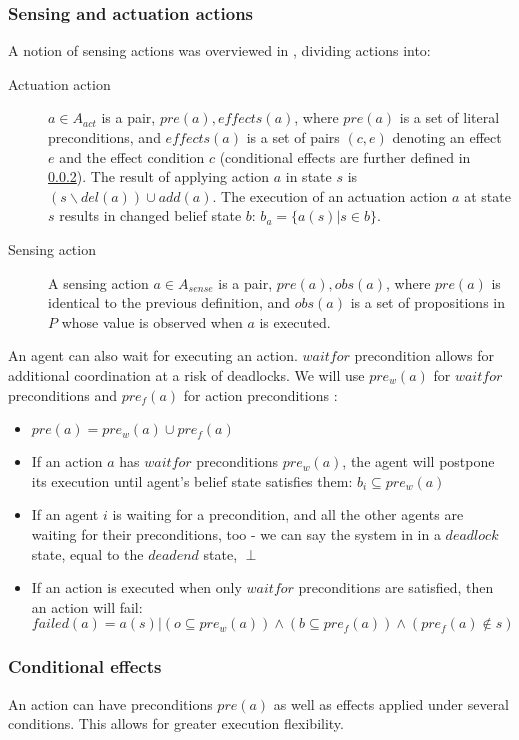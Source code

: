 \documentclass[fleqn,10pt]{olplainarticle}
\begin{document}
\subsubsection{Sensing and actuation actions}
A notion of sensing actions was overviewed in \cite{maliah_partially_2014}, dividing actions into:
\begin{description}
\item [Actuation action] $a \in A_{act}$ is a pair, ${pre(a), effects(a)}$, where $pre(a)$ is a set of literal preconditions, and $effects(a)$ is a set of pairs $(c, e)$ denoting an effect $e$ and the effect condition $c$ (conditional effects are further defined in \ref{cond-eff}). The result of applying action $a$ in state $s$ is $(s \backslash del(a)) \cup add(a)$. 
The execution of an actuation action $a$ at state $s$ results in changed belief state $b$: $b_a = \{a(s)|s \in b\}$. \label{belief-state}
\item [Sensing action] A sensing action $a \in A_{sense}$ is a pair, ${pre(a), obs(a)}$, where $pre(a)$ is identical to the previous definition, and $obs(a)$ is a set of propositions in $P$ whose value is observed when $a$ is executed. 
\end{description}

An agent can also wait for executing an action. $waitfor$ precondition allows for additional coordination at a risk of deadlocks. We will use $pre_w(a)$ for $waitfor$ preconditions and $pre_f(a)$ for action preconditions \cite{karpas_automated_2017}:
\begin{itemize}
    \item $pre(a) = pre_w(a) \cup pre_f(a)$
    \item If an action $a$ has $waitfor$ preconditions $pre_w(a)$, the agent will postpone its execution until agent's belief state satisfies them: $b_i \subseteq pre_w(a)$
    \item If an agent $i$ is waiting for a precondition, and all the other agents are waiting for their preconditions, too - we can say the system in in a $deadlock$ state, equal to the $deadend$ state, $\perp$
    \item If an action is executed when only $waitfor$ preconditions are satisfied, then an action will fail: $failed(a) = a(s)|(o \subseteq pre_w(a)) \land (b \subseteq pre_f(a)) \land (pre_f(a) \notin s)$
\end{itemize}

\subsubsection{Conditional effects} \label{cond-eff}
An action can have preconditions $pre(a)$ as well as effects applied under several conditions. This allows for greater execution flexibility.
\end{document}
